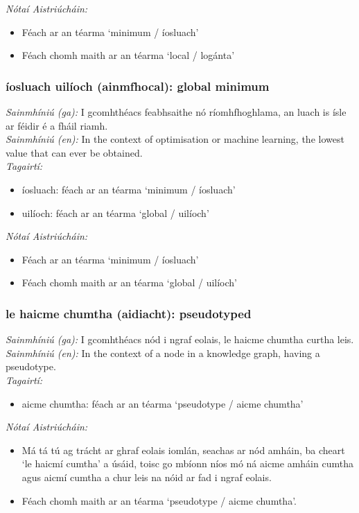  \noindent \textit{Nótaí Aistriúcháin:}
\begin{itemize}
	\item Féach ar an téarma `minimum / íosluach'
	\item Féach chomh maith ar an téarma `local / logánta'
\end{itemize}


\subsubsection*{íosluach uilíoch (ainmfhocal): global minimum}
 \noindent \textit{Sainmhíniú (ga):} I gcomhthéacs feabhsaithe nó ríomhfhoghlama, an luach is  ísle ar féidir é a fháil riamh.
\\
 \noindent \textit{Sainmhíniú (en):} In the context of optimisation or machine learning, the lowest value that can ever be obtained.
\\
 \noindent \textit{Tagairtí:}
\begin{itemize}
	\item íosluach: féach ar an téarma `minimum / íosluach'
	\item uilíoch: féach ar an téarma `global / uilíoch'
\end{itemize}

 \noindent \textit{Nótaí Aistriúcháin:}
\begin{itemize}
	\item Féach ar an téarma `minimum / íosluach'
	\item Féach chomh maith ar an téarma `global / uilíoch'
\end{itemize}


\subsubsection*{le haicme chumtha (aidiacht): pseudotyped}
 \noindent \textit{Sainmhíniú (ga):} I gcomhthéacs nód i ngraf eolais, le haicme chumtha curtha leis.
\\
 \noindent \textit{Sainmhíniú (en):} In the context of a node in a knowledge graph, having a pseudotype.
\\
 \noindent \textit{Tagairtí:}
\begin{itemize}
	\item aicme chumtha: féach ar an téarma `pseudotype / aicme chumtha'
\end{itemize}

 \noindent \textit{Nótaí Aistriúcháin:}
\begin{itemize}
	\item Má tá tú ag trácht ar ghraf eolais iomlán, seachas ar nód amháin, ba cheart `le haicmí cumtha' a úsáid, toisc go mbíonn níos mó ná aicme amháin cumtha agus aicmí cumtha a chur leis na nóid ar fad i ngraf eolais.
	\item Féach chomh maith ar an téarma `pseudotype / aicme chumtha'.
\end{itemize}


